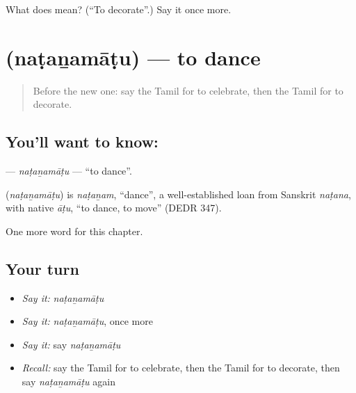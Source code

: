 \begin{tcolorbox}[breakable,colback=teal!4,colframe=teal!35!black,title={Before you move on}]
What does  mean? (\textquotedblleft{}To decorate\textquotedblright{}.) Say it once more.
\end{tcolorbox}
\section[\texorpdfstring{\ta{நடனமாடு} (naṭaṉamāṭu)}{நடனமாடு (naṭaṉamāṭu)}]{ (naṭaṉamāṭu) — to dance}

\label{lesson:TA-C165-natanamatu}



\begin{quote}
Before the new one: say the Tamil for to celebrate, then the Tamil for to decorate.
\end{quote}

\subsection*{You'll want to know: }
\textbf{} — \emph{naṭaṉamāṭu} — \textquotedblleft{}to dance\textquotedblright{}.

\begin{cousinweb}
\textbf{} (\emph{naṭaṉamāṭu}) is \emph{naṭaṉam}, \textquotedblleft{}dance\textquotedblright{}, a well-established loan from Sanskrit \emph{naṭana}, with native \emph{āṭu}, \textquotedblleft{}to dance, to move\textquotedblright{} (DEDR 347).
\end{cousinweb}

\begin{grammarlens}[title={What you've built}]
One more word for this chapter.
\end{grammarlens}

\subsection*{Your turn}
\begin{itemize}
\raggedright
  \item \emph{Say it:} \emph{naṭaṉamāṭu}
  \item \emph{Say it:} \emph{naṭaṉamāṭu}, once more
  \item \emph{Say it:} say \emph{naṭaṉamāṭu}
  \item \emph{Recall:} say the Tamil for to celebrate, then the Tamil for to decorate, then say \emph{naṭaṉamāṭu} again
\end{itemize}


